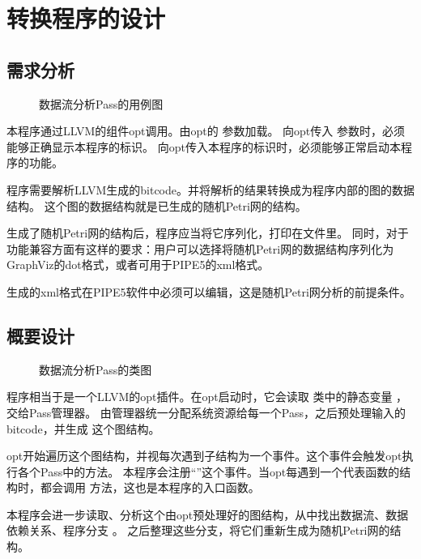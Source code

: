 
\section{转换程序的设计}

\subsection{需求分析}

\newsavebox{\umluc}
\begin{figure}[!hbt]
\centering
\usebox{\umluc}
\caption{数据流分析Pass的用例图} \label{fig:umluc}
\end{figure}

本程序通过LLVM的组件opt调用。由opt的  参数加载。
向opt传入  参数时，必须能够正确显示本程序的标识。
向opt传入本程序的标识时，必须能够正常启动本程序的功能。

程序需要解析LLVM生成的bitcode。并将解析的结果转换成为程序内部的图的数据结构。
这个图的数据结构就是已生成的随机Petri网的结构。

生成了随机Petri网的结构后，程序应当将它序列化，打印在文件里。
同时，对于功能兼容方面有这样的要求：用户可以选择将随机Petri网的数据结构序列化为GraphViz的dot格式，或者可用于PIPE5的xml格式。

生成的xml格式在PIPE5软件中必须可以编辑，这是随机Petri网分析的前提条件。


\subsection{概要设计}

\newsavebox{\umlclass}
\begin{figure}[!hbt]
\centering
\usebox{\umlclass}
\caption{数据流分析Pass的类图} \label{fig:umlclass}
\end{figure}

程序相当于是一个LLVM的opt插件。在opt启动时，它会读取  类中的静态变量 ，交给Pass管理器。
由管理器统一分配系统资源给每一个Pass，之后预处理输入的bitcode，并生成  这个图结构。

opt开始遍历这个图结构，并视每次遇到子结构为一个事件。这个事件会触发opt执行各个Pass中的方法。
本程序会注册“”这个事件。当opt每遇到一个代表函数的结构时，都会调用  方法，这也是本程序的入口函数。

本程序会进一步读取、分析这个由opt预处理好的图结构，从中找出数据流、数据依赖关系、程序分支 \cite{llvmmanual}。
之后整理这些分支，将它们重新生成为随机Petri网的结构。

